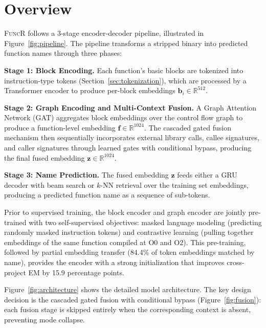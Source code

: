 \documentclass[sigconf,nonacm]{acmart}
\newcommand{\sysname}{\textsc{FuncR}}
\begin{document}

\section{Overview}
\label{sec:overview}

\sysname{} follows a 3-stage encoder-decoder pipeline, illustrated in Figure~\ref{fig:pipeline}. The pipeline transforms a stripped binary into predicted function names through three phases:

\textbf{Stage 1: Block Encoding.} Each function's basic blocks are tokenized into instruction-type tokens (Section~\ref{sec:tokenization}), which are processed by a Transformer encoder to produce per-block embeddings $\mathbf{b}_i \in \mathbb{R}^{512}$.

\textbf{Stage 2: Graph Encoding and Multi-Context Fusion.} A Graph Attention Network (GAT) aggregates block embeddings over the control flow graph to produce a function-level embedding $\mathbf{f} \in \mathbb{R}^{1024}$. The cascaded gated fusion mechanism then sequentially incorporates external library calls, callee signatures, and caller signatures through learned gates with conditional bypass, producing the final fused embedding $\mathbf{z} \in \mathbb{R}^{1024}$.

\textbf{Stage 3: Name Prediction.} The fused embedding $\mathbf{z}$ feeds either a GRU decoder with beam search or $k$-NN retrieval over the training set embeddings, producing a predicted function name as a sequence of sub-tokens.

Prior to supervised training, the block encoder and graph encoder are jointly pre-trained with two self-supervised objectives: masked language modeling (predicting randomly masked instruction tokens) and contrastive learning (pulling together embeddings of the same function compiled at O0 and O2). This pre-training, followed by partial embedding transfer (84.4\% of token embeddings matched by name), provides the encoder with a strong initialization that improves cross-project EM by 15.9 percentage points.

Figure~\ref{fig:architecture} shows the detailed model architecture. The key design decision is the cascaded gated fusion with conditional bypass (Figure~\ref{fig:fusion}): each fusion stage is skipped entirely when the corresponding context is absent, preventing mode collapse.

\end{document}
